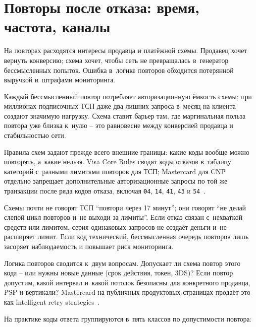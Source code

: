 \section{Повторы после отказа: время, частота, каналы}\label{sec:decline-retry}

На повторах расходятся интересы продавца и платёжной схемы. Продавец
хочет вернуть конверсию; схема хочет, чтобы сеть не превращалась
в~генератор бессмысленных попыток. Ошибка в~логике повторов
обходится потерянной выручкой и~штрафами мониторинга.

Каждый бессмысленный повтор
потребляет авторизационную ёмкость схемы; при миллионах подписочных
ТСП даже два лишних запроса в~месяц на клиента создают значимую
нагрузку. Схема ставит барьер там, где маргинальная польза повтора
уже близка к~нулю -- это равновесие между конверсией продавца
и стабильностью сети.

Правила схем задают прежде всего внешние границы:
какие коды вообще можно повторять, а~какие нельзя. Visa Core Rules
сводят коды отказов в~таблицу категорий с~разными лимитами
повторов для ТСП; Mastercard для
CNP отдельно запрещает дополнительные авторизационные запросы по той же
транзакции после ряда кодов отказа, включая \texttt{04},
\texttt{14}, \texttt{41},
\texttt{43} и \texttt{54}~\cite{visa-core-rules,mc-tpr}.

Схемы почти не говорят ТСП
\enquote{повтори через 17 минут}; они говорят \enquote{не делай слепой
цикл повторов и~не выходи за лимиты}. Если отказ связан с~нехваткой
средств или лимитом, серия одинаковых запросов не создаёт деньги и~не
расширяет лимит. Если код технический, бессмысленная очередь повторов
лишь засоряет наблюдаемость и повышает риск мониторинга.

Логика повторов сводится к~двум вопросам. Допускает ли схема повтор
этого кода -- или нужны новые данные (срок действия, токен, 3DS)?
Если повтор допустим, какой интервал и~какой потолок безопасны для
конкретного продавца, PSP и вертикали? Mastercard на
публичных продуктовых страницах продаёт это как intelligent retry
strategies~\cite{mc-bill-pay-solutions}.

На практике коды ответа группируются в~пять классов
по допустимости повтора:

